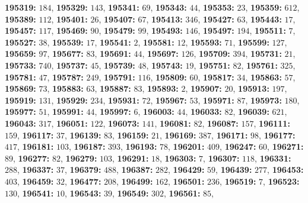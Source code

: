 \textsf{\bfseries 195319:} $184$, \textsf{\bfseries 195329:} $143$, \textsf{\bfseries 195341:} $69$, \textsf{\bfseries 195343:} $44$, \textsf{\bfseries 195353:} $23$, \textsf{\bfseries 195359:} $612$, \textsf{\bfseries 195389:} $112$, \textsf{\bfseries 195401:} $26$, \textsf{\bfseries 195407:} $67$, \textsf{\bfseries 195413:} $346$, \textsf{\bfseries 195427:} $63$, \textsf{\bfseries 195443:} $17$, \textsf{\bfseries 195457:} $117$, \textsf{\bfseries 195469:} $90$, \textsf{\bfseries 195479:} $99$, \textsf{\bfseries 195493:} $146$, \textsf{\bfseries 195497:} $194$, \textsf{\bfseries 195511:} $7$, \textsf{\bfseries 195527:} $38$, \textsf{\bfseries 195539:} $17$, \textsf{\bfseries 195541:} $2$, \textsf{\bfseries 195581:} $12$, \textsf{\bfseries 195593:} $71$, \textsf{\bfseries 195599:} $127$, \textsf{\bfseries 195659:} $97$, \textsf{\bfseries 195677:} $83$, \textsf{\bfseries 195691:} $44$, \textsf{\bfseries 195697:} $126$, \textsf{\bfseries 195709:} $394$, \textsf{\bfseries 195731:} $21$, \textsf{\bfseries 195733:} $740$, \textsf{\bfseries 195737:} $45$, \textsf{\bfseries 195739:} $48$, \textsf{\bfseries 195743:} $19$, \textsf{\bfseries 195751:} $82$, \textsf{\bfseries 195761:} $325$, \textsf{\bfseries 195781:} $47$, \textsf{\bfseries 195787:} $249$, \textsf{\bfseries 195791:} $116$, \textsf{\bfseries 195809:} $60$, \textsf{\bfseries 195817:} $34$, \textsf{\bfseries 195863:} $57$, \textsf{\bfseries 195869:} $73$, \textsf{\bfseries 195883:} $63$, \textsf{\bfseries 195887:} $83$, \textsf{\bfseries 195893:} $2$, \textsf{\bfseries 195907:} $20$, \textsf{\bfseries 195913:} $197$, \textsf{\bfseries 195919:} $131$, \textsf{\bfseries 195929:} $234$, \textsf{\bfseries 195931:} $72$, \textsf{\bfseries 195967:} $53$, \textsf{\bfseries 195971:} $87$, \textsf{\bfseries 195973:} $180$, \textsf{\bfseries 195977:} $51$, \textsf{\bfseries 195991:} $44$, \textsf{\bfseries 195997:} $6$, \textsf{\bfseries 196003:} $44$, \textsf{\bfseries 196033:} $82$, \textsf{\bfseries 196039:} $621$, \textsf{\bfseries 196043:} $317$, \textsf{\bfseries 196051:} $122$, \textsf{\bfseries 196073:} $141$, \textsf{\bfseries 196081:} $82$, \textsf{\bfseries 196087:} $157$, \textsf{\bfseries 196111:} $159$, \textsf{\bfseries 196117:} $37$, \textsf{\bfseries 196139:} $83$, \textsf{\bfseries 196159:} $21$, \textsf{\bfseries 196169:} $387$, \textsf{\bfseries 196171:} $98$, \textsf{\bfseries 196177:} $417$, \textsf{\bfseries 196181:} $103$, \textsf{\bfseries 196187:} $393$, \textsf{\bfseries 196193:} $78$, \textsf{\bfseries 196201:} $409$, \textsf{\bfseries 196247:} $60$, \textsf{\bfseries 196271:} $89$, \textsf{\bfseries 196277:} $82$, \textsf{\bfseries 196279:} $103$, \textsf{\bfseries 196291:} $18$, \textsf{\bfseries 196303:} $7$, \textsf{\bfseries 196307:} $118$, \textsf{\bfseries 196331:} $288$, \textsf{\bfseries 196337:} $37$, \textsf{\bfseries 196379:} $488$, \textsf{\bfseries 196387:} $282$, \textsf{\bfseries 196429:} $59$, \textsf{\bfseries 196439:} $277$, \textsf{\bfseries 196453:} $403$, \textsf{\bfseries 196459:} $32$, \textsf{\bfseries 196477:} $208$, \textsf{\bfseries 196499:} $162$, \textsf{\bfseries 196501:} $236$, \textsf{\bfseries 196519:} $7$, \textsf{\bfseries 196523:} $130$, \textsf{\bfseries 196541:} $10$, \textsf{\bfseries 196543:} $39$, \textsf{\bfseries 196549:} $302$, \textsf{\bfseries 196561:} $85$, 
